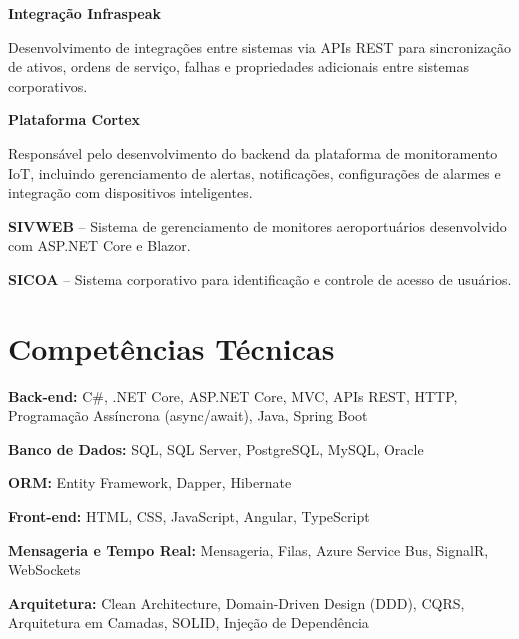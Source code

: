 \documentclass[11pt,a4paper]{article}
\begin{document}
\textbf{Integração Infraspeak}

Desenvolvimento de integrações entre sistemas via APIs REST para sincronização de ativos, ordens de serviço, falhas e propriedades adicionais entre sistemas corporativos.

\vspace{0.2cm}

\textbf{Plataforma Cortex}

Responsável pelo desenvolvimento do backend da plataforma de monitoramento IoT, incluindo gerenciamento de alertas, notificações, configurações de alarmes e integração com dispositivos inteligentes.

\vspace{0.2cm}

\textbf{SIVWEB} -- Sistema de gerenciamento de monitores aeroportuários desenvolvido com ASP.NET Core e Blazor.

\vspace{0.2cm}

\textbf{SICOA} -- Sistema corporativo para identificação e controle de acesso de usuários.

\section{Competências Técnicas}

\textbf{Back-end:} C\#, .NET Core, ASP.NET Core, MVC, APIs REST, HTTP, Programação Assíncrona (async/await), Java, Spring Boot

\vspace{0.12cm}

\textbf{Banco de Dados:} SQL, SQL Server, PostgreSQL, MySQL, Oracle

\vspace{0.12cm}

\textbf{ORM:} Entity Framework, Dapper, Hibernate

\vspace{0.12cm}

\textbf{Front-end:} HTML, CSS, JavaScript, Angular, TypeScript

\vspace{0.12cm}

\textbf{Mensageria e Tempo Real:} Mensageria, Filas, Azure Service Bus, SignalR, WebSockets

\vspace{0.12cm}

\textbf{Arquitetura:} Clean Architecture, Domain-Driven Design (DDD), CQRS, Arquitetura em Camadas, SOLID, Injeção de Dependência
\end{document}
